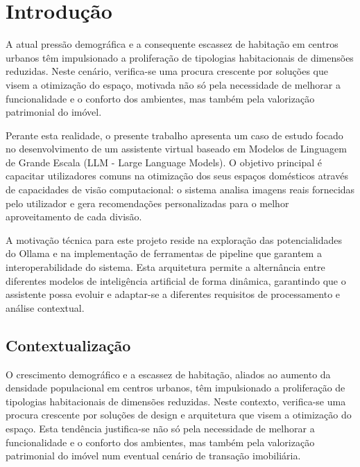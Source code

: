 \documentclass[a4paper,12pt]{scrreprt}
\begin{document}
\pagebreak

\listoffigures

\pagebreak

\listoftables

\pagebreak





\chapter{Introdução}
    A atual pressão demográfica e a consequente escassez de habitação em centros urbanos têm impulsionado a proliferação de tipologias habitacionais de dimensões reduzidas. Neste cenário, verifica-se uma procura crescente por soluções que visem a otimização do espaço, motivada não só pela necessidade de melhorar a funcionalidade e o conforto dos ambientes, mas também pela valorização patrimonial do imóvel.

    Perante esta realidade, o presente trabalho apresenta um caso de estudo focado no desenvolvimento de um assistente virtual baseado em Modelos de Linguagem de Grande Escala (LLM - Large Language Models). O objetivo principal é capacitar utilizadores comuns na otimização dos seus espaços domésticos através de capacidades de visão computacional: o sistema analisa imagens reais fornecidas pelo utilizador e gera recomendações personalizadas para o melhor aproveitamento de cada divisão.
    
    A motivação técnica para este projeto reside na exploração das potencialidades do Ollama e na implementação de ferramentas de pipeline que garantem a interoperabilidade do sistema. Esta arquitetura permite a alternância entre diferentes modelos de inteligência artificial de forma dinâmica, garantindo que o assistente possa evoluir e adaptar-se a diferentes requisitos de processamento e análise contextual.
    \section{Contextualização}
        O crescimento demográfico e a escassez de habitação, aliados ao aumento da densidade populacional em centros urbanos, têm impulsionado a proliferação de tipologias habitacionais de dimensões reduzidas. Neste contexto, verifica-se uma procura crescente por soluções de design e arquitetura que visem a otimização do espaço. Esta tendência justifica-se não só pela necessidade de melhorar a funcionalidade e o conforto dos ambientes, mas também pela valorização patrimonial do imóvel num eventual cenário de transação imobiliária.
\end{document}
